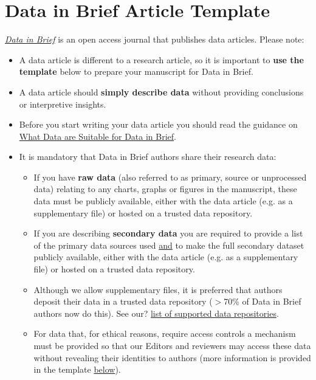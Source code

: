 \documentclass[times,final]{elsarticle}
\begin{document}
\section*{Data in Brief Article Template}
\noindent \href{https://www.journals.elsevier.com/data-in-brief/about-data-in-brief/data-in-brief-faq}%
{\textit{Data in Brief}}
is an open access journal that publishes data articles.
Please note:
\begin{itemize}
\item A data article is different to a research article, so it is
important to \textbf{use the template} below to prepare your manuscript for Data
in Brief.
\item A data article should \textbf{simply describe data} without providing
conclusions or interpretive insights.
\item Before you start writing your data article you should read the
guidance on
\href{https://www.journals.elsevier.com/data-in-brief/policies-and-guidelines/what-data-are-suitable-for-data-in-brief}%
{What Data are Suitable for Data in Brief}.
\item It is mandatory that Data in Brief authors share their research data:
\begin{itemize}
\item If you have \textbf{raw data} (also referred to as primary, source or
unprocessed data) relating to any charts, graphs or figures in the
manuscript, these data must be publicly available, either with the data
article (e.g. as a supplementary file) or hosted on a trusted data
repository.

\item If you are describing \textbf{secondary data} you are required to provide
a list of the primary data sources used \underline{and} to make the full secondary
dataset publicly available, either with the data article (e.g. as a
supplementary file) or hosted on a trusted data repository.

\item Although we allow supplementary files, it is preferred that
authors deposit their data in a trusted data repository ($>$70\% of
Data in Brief authors now do this). See our?
\href{https://www.elsevier.com/authors/author-resources/research-data/data-base-linking#repositories}%
{list of supported data repositories}.

\item For data that, for ethical reasons, require access controls a
mechanism must be provided so that our Editors and reviewers may access
these data without revealing their identities to authors (more
information is provided in the template \hyperlink{target1}{below}).
\end{itemize}
\end{itemize}
\end{document}
